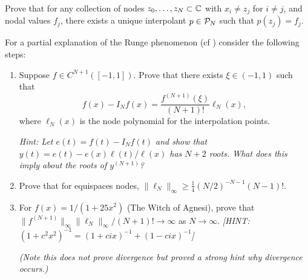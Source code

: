    



   

\begin{exercise} 
   \label{exr:poly:interpunique}
   Prove that for any collection of nodes $z_0, \dots, z_N \subset \mathbb{C}$ with $x_i
   \neq z_j$  for $i \neq j$, and nodal values $f_j$, there exists a unique
   interpolant $p \in \mathcal{P}_N$ such that $p(z_j) = f_j$. 
\end{exercise}

\begin{exercise}
   \label{exr:poly:Runge Phenomenon}
   For a partial explanation of the Runge phenomenon (cf \nbpoly) consider 
   the following steps: 
   \begin{enumerate} \ilist 
      \item Suppose $f \in C^{N+1}([-1,1])$. Prove that there exists 
      $\xi \in (-1,1)$ such that 
      \[
         f(x) - I_N f(x) =  \frac{f^{(N+1)}(\xi)}{(N+1)!} 
            \ell_N(x),
      \]
      where $\ell_N(x)$ is the node polynomial for the interpolation points. 

      {\it Hint: Let $e(t) = f(t)-I_N f(t)$ and show that $y(t) = e(t) - e(x)
      \ell(t) / \ell(x)$ has $N+2$ roots. What does this imply about the roots
      of $y^{(N+1)}$?}

      \item Prove that for equispaces nodes, $\|\ell_N\|_\infty \geq \frac14
      (N/2)^{-N-1} (N-1)!$.

      \item For $f(x) = 1 / (1+25 x^2)$ (The Witch of Agnesi), prove that $\|
       f^{(N+1)} \|_\infty \| \ell_N \|_\infty  / (N+1)! \to \infty$ as $N \to
       \infty$. {\it [HINT: $(1+c^2x^2)^{-1} = (1+cix)^{-1}+(1-cix)^{-1}$]}

       {\it (Note this does not prove divergence but proved a strong 
       hint why divergence occurs.)}
   \end{enumerate}
\end{exercise}


